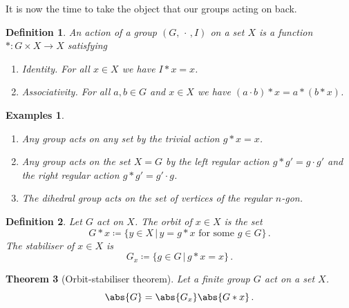 \documentclass{article}
\theoremstyle{plain}\theoremheaderfont{\normalfont\itshape}\theorembodyfont{\rmfamily}\theoremseparator{.}\newtheorem*{rem}{Remark}\newtheorem*{ex}{Example}\newtheorem*{proof}{Proof}\newtheorem*{altp}{Alternative proof}
\theoremstyle{plain}\theoremheaderfont{\normalfont\bfseries}\theorembodyfont{\rmfamily}\theoremseparator{.}\newtheorem{thm}{Theorem}[section]\newtheorem{lem}[thm]{Lemma}\newtheorem{prop}[thm]{Proposition}\newtheorem*{cor}{Corollary}\newtheorem{defn}[thm]{Definition}\newtheorem{clm}[thm]{Claim}\newtheorem{clminproof}{Claim}
\theoremstyle{break}\theoremheaderfont{\normalfont\itshape}\theorembodyfont{\rmfamily}\theoremseparator{.\medskip}\newtheorem*{proofskip}{Proof}\newtheorem*{exs}{Examples}\newtheorem*{rems}{Remarks}
\theoremstyle{break}\theoremheaderfont{\normalfont\bfseries}\theorembodyfont{\rmfamily}\theoremseparator{.\medskip}\newtheorem{lemskip}[thm]{Lemma}\newtheorem{defnskip}[thm]{Definition}\newtheorem{propskip}[thm]{Proposition}\newtheorem{thmskip}[thm]{Theorem}
\numberwithin{equation}{section}
\begin{document}
	It is now the time to take the object that our groups acting on back.

	\begin{defn}
		An action of a group \((G,\,\cdot\,, I)\) on a set \(X\) is a function \( * : G\times X \to X\) satisfying
		\begin{enumerate}[topsep=0pt]
			\item[(A1)] \textit{Identity.} For all \(x \in X\) we have \(I*x=x\).
			\item[(A2)] \textit{Associativity.} For all \(a,b\in G\) and \(x\in X\) we have \((a\cdot b)*x=a*(b*x)\).
		\end{enumerate}
	\end{defn}
	\begin{exs}
		\begin{enumerate}[topsep=0pt,label=(\roman*)]
			\item Any group acts on any set by the \textit{trivial action} \(g*x=x\).
			\item Any group acts on the set \(X=G\) by the \textit{left regular action} \(g*g'=g\cdot g'\) and the \textit{right regular action} \(g*g'=g'\cdot g\).
			\item The dihedral group acts on the set of vertices of the regular \(n\)-gon.
		\end{enumerate}
	\end{exs}
	\begin{defn}
		Let \(G\) act on \(X\). The \textit{orbit} of \(x\in X\) is the set
		\[G*x\coloneqq \{y\in X\,|\,y=g*x\text{ for some }g\in G\}\,.\]
		The \textit{stabiliser} of \(x\in X\) is
		\[G_x\coloneqq\{g\in G\,|\,g*x=x\}\,.\]
	\end{defn}
	\begin{thm}[Orbit-stabiliser theorem]
		Let a finite group \(G\) act on a set \(X\).
		\[\abs{G}=\abs{G_x}\abs{G*x}\,.\]	
	\end{thm}
\end{document}
